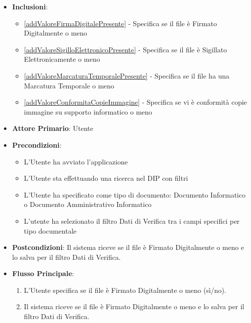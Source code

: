 \begin{itemize}
\begin{enumerate}
      \end{enumerate}
      \item \textbf{Inclusioni}: 
      \begin{itemize} 
            \item \ref{addValoreFirmaDigitalePresente} - Specifica se il file è Firmato Digitalmente o meno
            \item \ref{addValoreSigilloElettronicoPresente} - Specifica se il file è Sigillato Elettronicamente o meno
            \item \ref{addValoreMarcaturaTemporalePresente} - Specifica se il file ha una Marcatura Temporale o meno
            \item \ref{addValoreConformitaCopieImmagine} - Specifica se vi è conformità copie immagine su supporto informatico o meno
      \end{itemize}
\end{itemize}

\label{addValoreFirmaDigitalePresente}
\begin{itemize}
      \item \textbf{Attore Primario}: Utente
      \item \textbf{Precondizioni}: 
      \begin{itemize}
            \item L'Utente ha avviato l'applicazione
            \item L'Utente sta effettuando una ricerca nel DIP con filtri
            \item L'Utente ha specificato come tipo di documento: Documento Informatico o Documento Amministrativo Informatico
            \item L'utente ha selezionato il filtro Dati di Verifica tra i campi specifici per tipo documentale
      \end{itemize}
      \item \textbf{Postcondizioni}: Il sistema riceve se il file è Firmato Digitalmente o meno e lo salva per il filtro Dati di Verifica.
      \item \textbf{Flusso Principale}:
      \begin{enumerate}
            \item L'Utente specifica se il file è Firmato Digitalmente o meno (sì/no).
            \item Il sistema riceve se il file è Firmato Digitalmente o meno e lo salva per il filtro Dati di Verifica.
      \end{enumerate}
\end{itemize}

